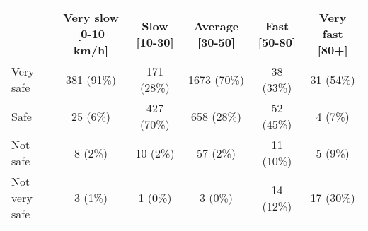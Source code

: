 \begin{tabular}{l c|c|c|c|c} \hline  & Very slow [0-10 km/h] & Slow [10-30] & Average [30-50] & Fast [50-80] & Very fast [80+] \\ 
\hline Very safe & 381 (91\%) & 171 (28\%) & 1673 (70\%) & 38 (33\%) & 31 (54\%) \\ 
  Safe & 25 (6\%) & 427 (70\%) & 658 (28\%) & 52 (45\%) & 4 (7\%) \\ 
  Not safe & 8 (2\%) & 10 (2\%) & 57 (2\%) & 11 (10\%) & 5 (9\%) \\ 
  Not very safe & 3 (1\%) & 1 (0\%) & 3 (0\%) & 14 (12\%) & 17 (30\%) \\ 
 \hline \end{tabular}